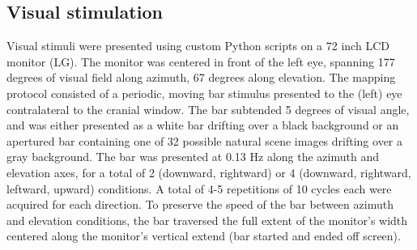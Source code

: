
\subsection{Visual stimulation}
Visual stimuli were presented using custom Python scripts on a 72 inch LCD monitor (LG). The monitor was centered in front of the left eye, spanning 177 degrees of visual field along azimuth, 67 degrees along elevation. The mapping protocol consisted of a periodic, moving bar stimulus \cite{Kalatsky2003, Marshel2011} presented to the (left) eye contralateral to the cranial window. The bar subtended 5 degrees of visual angle, and was either presented as a white bar drifting over a black background or an apertured bar containing one of 32 possible natural scene images drifting over a gray background. The bar was presented at 0.13 Hz along the azimuth and elevation axes, for a total of 2 (downward, rightward) or 4 (downward, rightward, leftward, upward) conditions. A total of 4-5 repetitions of 10 cycles each were acquired for each direction. To preserve the speed of the bar between azimuth and elevation conditions, the bar traversed the full extent of the monitor's width centered along the monitor's vertical extend (bar started and ended off screen). 

